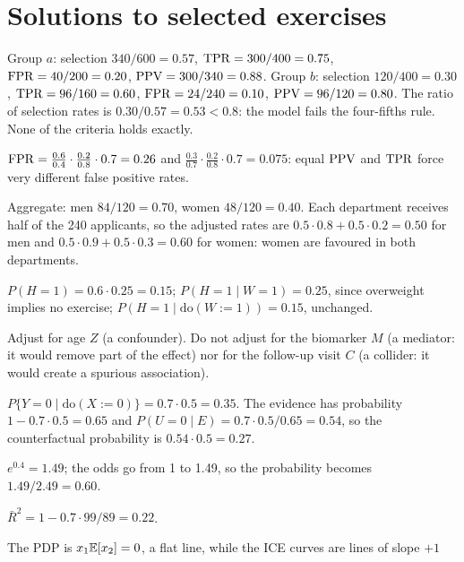\section*{Solutions to selected exercises}

\begin{description}[font=\bfseries,leftmargin=0pt,itemsep=5pt]
  \item[\ref{exr3:groups}] Group $a$: selection $340/600=0.57$, $\mathrm{TPR}=300/400=0.75$, $\mathrm{FPR}=40/200=0.20$,
        $\mathrm{PPV}=300/340=0.88$. Group $b$: selection $120/400=0.30$, $\mathrm{TPR}=96/160=0.60$, $\mathrm{FPR}=24/240=0.10$,
        $\mathrm{PPV}=96/120=0.80$. The ratio of selection rates is $0.30/0.57=0.53<0.8$: the model fails the
        four-fifths rule. None of the criteria holds exactly.
  \item[\ref{exr3:chouldechova}] $\mathrm{FPR}=\frac{0.6}{0.4}\cdot\frac{0.2}{0.8}\cdot0.7=0.26$ and
        $\frac{0.3}{0.7}\cdot\frac{0.2}{0.8}\cdot0.7=0.075$: equal $\mathrm{PPV}$ and $\mathrm{TPR}$ force very different
        false positive rates.
  \item[\ref{exr3:simpson}] Aggregate: men $84/120=0.70$, women $48/120=0.40$. Each department receives half
        of the 240 applicants, so the adjusted rates are $0.5\cdot0.8+0.5\cdot0.2=0.50$ for men and
        $0.5\cdot0.9+0.5\cdot0.3=0.60$ for women: women are favoured in both departments.
  \item[\ref{exr3:heart}] $P(H=1)=0.6\cdot0.25=0.15$; $P(H=1\mid W=1)=0.25$, since overweight implies no
        exercise; $P(H=1\mid\mathrm{do}(W:=1))=0.15$, unchanged.
  \item[\ref{exr3:adjust}] Adjust for age $Z$ (a confounder). Do not adjust for the biomarker $M$ (a mediator:
        it would remove part of the effect) nor for the follow-up visit $C$ (a collider: it would create a
        spurious association).
  \item[\ref{exr3:traffic}] $P\{Y=0\mid\mathrm{do}(X:=0)\}=0.7\cdot0.5=0.35$. The evidence has probability
        $1-0.7\cdot0.5=0.65$ and $P(U=0\mid E)=0.7\cdot0.5/0.65=0.54$, so the counterfactual probability is
        $0.54\cdot0.5=0.27$.
  \item[\ref{exr3:odds}] $e^{0.4}=1.49$; the odds go from 1 to 1.49, so the probability becomes
        $1.49/2.49=0.60$.
  \item[\ref{exr3:adjr2}] $\bar R^2=1-0.7\cdot99/89=0.22$.
  \item[\ref{exr3:pdp}] The PDP is $x_1\mathbb{E}[x_2]=0$, a flat line, while the ICE curves are lines of slope $+1$

\end{description}
